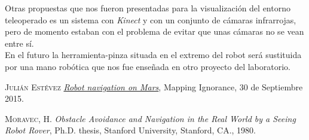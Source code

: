 \documentclass[a4paper, fontsize=11pt]{scrartcl} %
\numberwithin{equation}{section} %
\numberwithin{figure}{section} %
\numberwithin{table}{section} %
\begin{document}
	Otras propuestas que nos fueron presentadas para la visualización del entorno teleoperado es un sistema con \textit{Kinect} y con un conjunto de cámaras infrarrojas, pero de momento estaban con el problema de evitar que unas cámaras no se vean entre sí.\\
	
	En el futuro la herramienta-pinza situada en el extremo del robot será sustituida por una mano robótica que nos fue enseñada en otro proyecto del laboratorio.
	
	
	\begin{thebibliography}{X}
		
		 \textsc{Julián Estévez} \textit{\href{http://mappingignorance.org/2015/09/30/robot-navigation-on-mars/}{Robot navigation on Mars}}, Mapping Ignorance, 30 de Septiembre 2015.
		
		 \textsc{Moravec, H.} \textit{ Obstacle Avoidance and Navigation in the Real World by a Seeing Robot Rover}, Ph.D. thesis, Stanford University, Stanford, CA., 1980.
		
	\end{thebibliography}
	
 	
\end{document}
